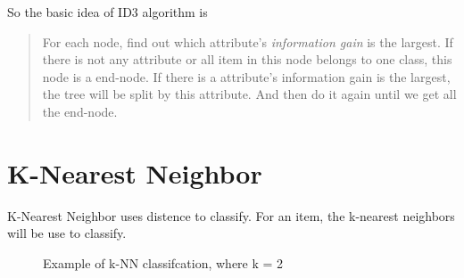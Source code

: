 \documentclass{article}
\begin{document}
So the basic idea of ID3 algorithm is 
\begin{quote}
  For each node, find out which attribute's \textit{information gain} is the largest.
  If there is not any attribute or all item in this node belongs to one class, this node is a end-node.
  If there is a attribute's information gain is the largest, the tree will be split by this attribute.
  And then do it again until we get all the end-node.
\end{quote}

\section{K-Nearest Neighbor}
\label{sec:knn}

K-Nearest Neighbor uses distence to classify. For an item, the k-nearest neighbors will be use
to classify.
\begin{figure}
  \centering
  \caption{Example of k-NN classifcation, where k = 2}
  \label{fig:knn:eg}
\end{figure}
\end{document}

